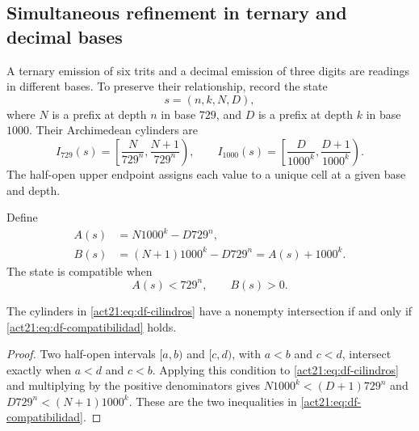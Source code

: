 \subsection{Simultaneous refinement in ternary and decimal bases}
\label{act21:subsec:df-cilindros-mixtos}


A ternary emission of six trits and a decimal emission of three digits
are readings in different bases. To preserve their relationship, record
the state
\[
 s=(n,k,N,D),
\]
where \(N\) is a prefix at depth \(n\) in base \(729\), and \(D\) is
a prefix at depth \(k\) in base \(1000\). Their Archimedean cylinders are
\begin{equation}
 I_{729}(s)=\left[\frac{N}{729^n},\frac{N+1}{729^n}\right),\qquad
 I_{1000}(s)=\left[\frac{D}{1000^k},\frac{D+1}{1000^k}\right).
 \label{act21:eq:df-cilindros}
\end{equation}
The half-open upper endpoint assigns each value to a unique cell at a
given base and depth.

\begin{definition}
Define
\begin{align}
 A(s)&=N1000^k-D729^n,\label{act21:eq:df-defecto-inferior}\\
 B(s)&=(N+1)1000^k-D729^n=A(s)+1000^k.
 \label{act21:eq:df-defecto-superior}
\end{align}
The state is compatible when
\begin{equation}
 A(s)<729^n,\qquad B(s)>0.
 \label{act21:eq:df-compatibilidad}
\end{equation}
\end{definition}

\begin{lemma}
The cylinders in \eqref{act21:eq:df-cilindros} have a nonempty intersection if
and only if \eqref{act21:eq:df-compatibilidad} holds.
\end{lemma}

\begin{proof}
Two half-open intervals \([a,b)\) and \([c,d)\), with \(a<b\) and
\(c<d\), intersect exactly when \(a<d\) and \(c<b\). Applying this
condition to \eqref{act21:eq:df-cilindros} and multiplying by the positive
denominators gives
\(N1000^k<(D+1)729^n\) and
\(D729^n<(N+1)1000^k\). These are the two inequalities in
\eqref{act21:eq:df-compatibilidad}.
\end{proof}

